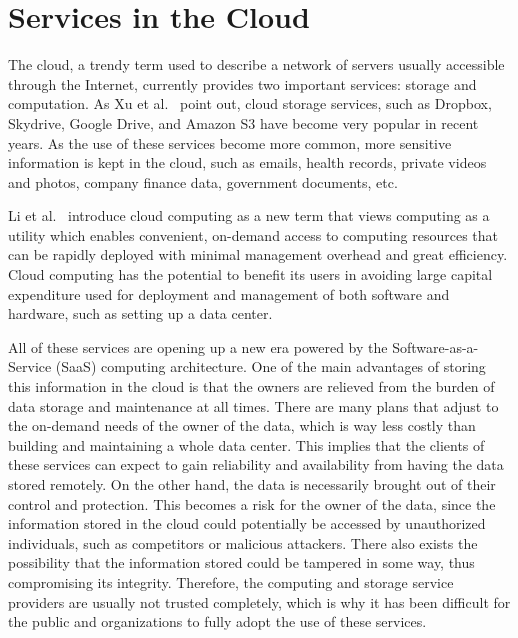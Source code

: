 \section{Services in the Cloud}

The cloud, a trendy term used to describe a network of servers usually accessible through the Internet, currently provides two important services: storage and computation. As Xu et al.\ \cite{cryptoeprint:2011:574} point out, cloud storage services, such as Dropbox, Skydrive, Google Drive, and Amazon S3 have become very popular in recent years. As the use of these services become more common, more sensitive information is kept in the cloud, such as emails, health records, private videos and photos, company finance data, government documents, etc. 

Li et al.\ \cite{cryptoeprint:2009:593} introduce cloud computing as a new term that views computing as a utility which enables convenient, on-demand access to computing resources that can be rapidly deployed with minimal management overhead and great efficiency. Cloud computing has the potential to benefit its users in avoiding large capital expenditure used for deployment and management of both software and hardware, such as setting up a data center. 

All of these services are opening up a new era powered by the Software-as-a-Service (SaaS) computing architecture. One of the main advantages of storing this information in the cloud is that the owners are relieved from the burden of data storage and maintenance at all times. There are many plans that adjust to the on-demand needs of the owner of the data, which is way less costly than building and maintaining a whole data center. This implies that the clients of these services can expect to gain reliability and availability from having the data stored remotely. On the other hand, the data is necessarily brought out of their control and protection. This becomes a risk for the owner of the data, since the information stored in the cloud could potentially be accessed by unauthorized individuals, such as competitors or malicious attackers. There also exists the possibility that the information stored could be tampered in some way, thus compromising its integrity. Therefore, the computing and storage service providers are usually not trusted completely, which is why it has been difficult for the public and organizations to fully adopt the use of these services.

